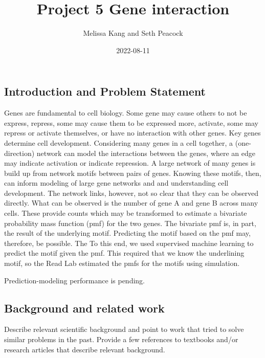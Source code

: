 \documentclass[
]{article}
\title{Project 5 Gene interaction}
\author{Melissa Kang and Seth Peacock}
\date{2022-08-11}
\begin{document}
\maketitle

\hypertarget{introduction-and-problem-statement}{%
\subsection{Introduction and Problem
Statement}\label{introduction-and-problem-statement}}

Genes are fundamental to cell biology. Some gene may cause others to not
be express, repress, some may cause them to be expressed more, activate,
some may repress or activate themselves, or have no interaction with
other genes. Key genes determine cell development. Considering many
genes in a cell together, a (one-direction) network can model the
interactions between the genes, where an edge may indicate activation or
indicate repression. A large network of many genes is build up from
network motifs between pairs of genes. Knowing these motifs, then, can
inform modeling of large gene networks and and understanding cell
development. The network links, however, not so clear that they can be
observed directly. What can be observed is the number of gene A and gene
B across many cells. These provide counts which may be transformed to
estimate a bivariate probability mass function (pmf) for the two genes.
The bivariate pmf is, in part, the result of the underlying motif.
Predicting the motif based on the pmf may, therefore, be possible. The
To this end, we used supervised machine learning to predict the motif
given the pmf. This required that we know the underlining motif, so the
Read Lab estimated the pmfs for the motifs using simulation.

Prediction-modeling performance is pending.

\hypertarget{background-and-related-work}{%
\subsection{Background and related
work}\label{background-and-related-work}}

Describe relevant scientific background and point to work that tried to
solve similar problems in the past. Provide a few references to
textbooks and/or research articles that describe relevant background.
\end{document}
